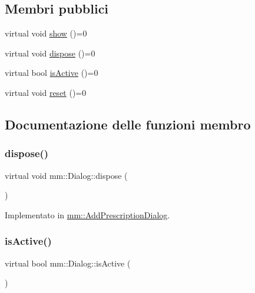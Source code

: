 \subsection*{Membri pubblici}
\begin{DoxyCompactItemize}
\item 
virtual void \hyperlink{classmm_1_1_dialog_afda4b0dc7c0ac027c4b8fdb95713700f}{show} ()=0
\item 
virtual void \hyperlink{classmm_1_1_dialog_a3f2e361836af48ee3808f4dd6e4f8e48}{dispose} ()=0
\item 
virtual bool \hyperlink{classmm_1_1_dialog_a22abaf4e90b6fdca5c20039f6b9e15ac}{is\+Active} ()=0
\item 
virtual void \hyperlink{classmm_1_1_dialog_abe6e5ac072c12c06971f60491f079d80}{reset} ()=0
\end{DoxyCompactItemize}


\subsection{Documentazione delle funzioni membro}
\mbox{\label{classmm_1_1_dialog_a3f2e361836af48ee3808f4dd6e4f8e48}} 
\subsubsection{\texorpdfstring{dispose()}{dispose()}}
{\footnotesize\ttfamily virtual void mm\+::\+Dialog\+::dispose (\begin{DoxyParamCaption}{ }\end{DoxyParamCaption})\hspace{0.3cm}{\ttfamily [pure virtual]}}



Implementato in \hyperlink{classmm_1_1_add_prescription_dialog_aacb58c7617be2323d91cd5ab2f28e354}{mm\+::\+Add\+Prescription\+Dialog}.

\mbox{\label{classmm_1_1_dialog_a22abaf4e90b6fdca5c20039f6b9e15ac}} 
\subsubsection{\texorpdfstring{is\+Active()}{isActive()}}
{\footnotesize\ttfamily virtual bool mm\+::\+Dialog\+::is\+Active (\begin{DoxyParamCaption}{ }\end{DoxyParamCaption})\hspace{0.3cm}{\ttfamily [pure virtual]}}



